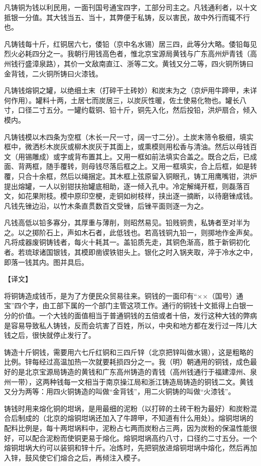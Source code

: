 \documentclass[12pt,UTF8]{ctexbook}
\begin{document}
凡铸铜为钱以利民用，一面刊国号通宝四字，工部分司主之。凡钱通利者，以十文抵银一分值。其大钱当五、当十，其弊便于私铸，反以害民，故中外行而辄不行也。

凡铸钱每十斤，红铜居六七，倭铅（京中名水锡）居三四，此等分大略。倭铅每见烈火必耗四分之一。我朝行用钱高色者，惟北京宝源局黄钱与广东高州炉青钱（高州钱行盛漳泉路），其价一文敌南直江、浙等二文。黄钱又分二等，四火铜所铸曰金背钱，二火铜所铸曰火漆钱。

凡铸钱熔铜之罐，以绝细土末（打碎干土砖妙）和炭末为之（京炉用牛蹄甲，未详何作用）。罐料十两，土居七而炭居三，以炭灰性暖，佐土使易化物也。罐长八寸，口径二寸五分。一罐约载铜、铅十斤，铜先入化，然后投铅，洪炉扇合，倾入模内。

凡铸钱模以木四条为空框（木长一尺一寸，阔一寸二分）。土炭末筛令极细，填实框中，微洒杉木炭灰或柳木炭灰于其面上，或熏模则用松香与清油。然后以母钱百文（用锡雕成）或字或背布置其上。又用一框如前法填实合盖之。既合之后，已成面、背两框，随手覆转，则母钱尽落后框之上。又用一框填实，合上后框，如是转覆，只合十余框，然后以绳捆定。其木框上弦原留入铜眼孔，铸工用鹰嘴钳，洪炉提出熔罐，一人以别钳扶抬罐底相助，逐一倾入孔中。冷定解绳开框，则磊落百文，如花果附枝。模中原印空梗，走铜如树枝样，挟出逐一摘断，以待磨锉成钱。凡钱先锉边沿，以竹木条直贯数百文受锉，后锉平面则逐一为之。

凡钱高低以铅多寡分，其厚重与薄削，则昭然易见。铅贱铜贵，私铸者至对半为之。以之掷阶石上，声如木石者，此低钱也。若高钱铜九铅一，则掷地作金声矣。凡将成器废铜铸钱者，每火十耗其一。盖铅质先走，其铜色渐高，胜于新铜初化者。若琉球诸国银钱，其模即凿锲铁钳头上。银化之时入锅夹取，淬于冷水之中，即落一钱其内。图并具后。

【译文】

将铜铸造成钱币，是为了方便民众贸易往来。铜钱的一面印有“××（国号）通宝”四个字，由工部下属的一个部门主管这项工作。通行的铜钱十文抵得上白银一分的价值。一个大钱的面值相当于普通铜钱的五倍或者十倍，发行这种大钱的弊病是容易导致私人铸钱，反而会坑害了百姓，所以，中央和地方都在发行过一阵儿大钱之后，很快就停止发行了。

铸造十斤铜钱，需要用六七斤红铜和三四斤锌（北京把锌叫做水锡），这是粗略的比例。锌每经过高温加热一次就要耗损四分之一。我（明）朝通用的铜钱，成色最好的是北京宝源局铸造的黄钱和广东高州铸造的青钱（高州钱通行于福建漳州、泉州一带），这两种钱每一文相当于南京操江局和浙江铸造局铸造的铜钱二文。黄钱又分为两等：用四火铜铸造的叫做“金背钱”，用二火铜铸的叫做“火漆钱”。

铸钱时用来熔化铜的坩埚，是用最细的泥粉（以打碎的土砖干粉为最好）和炭粉混合后制成的（北京的熔铜坩埚还加入了牛蹄甲，不知道有什么用处）。熔铜坩埚的配料比例是，每十两坩埚料中，泥粉占七两而炭粉占三两，因为炭粉的保温性能很好，可以配合泥粉而使铜更易于熔化。熔铜坩埚高约八寸，口径约二寸五分。一个熔铜坩埚大约可以装铜和锌十斤。冶炼时，先把铜放进熔铜坩埚中熔化，然后再加入锌，鼓风使它们熔合之后，再倾注入模子。
\end{document}
